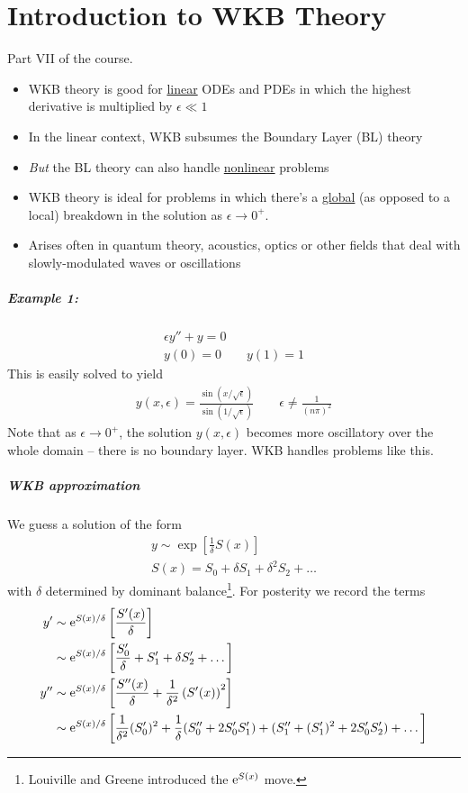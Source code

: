 \chapter[WKB]{Introduction to WKB Theory}
Part VII of the course.
\begin{itemize}
	\item WKB theory is good for \underline{linear} ODEs and PDEs in which the highest derivative is multiplied by $\epsilon \ll 1$
	\item In the linear context, WKB subsumes the Boundary Layer (BL) theory
	\item \emph{But} the BL theory can also handle \underline{nonlinear} problems
	\item WKB theory is ideal for problems in which there's a \underline{global} (as opposed to a local) breakdown in the solution as $\epsilon \rightarrow 0^+$.  
	\item Arises often in quantum theory, acoustics, optics or other fields that deal with slowly-modulated waves or oscillations
\end{itemize}
 
\paragraph{Example 1:}
\begin{gather*}
	\epsilon y'' + y = 0 \\
	y(0) = 0 \qquad y(1) = 1
\end{gather*}
This is easily solved to yield
\begin{gather*}
	y(x,\epsilon) = \frac{\sin (x/\sqrt{\epsilon})}{\sin (1/\sqrt{\epsilon})} \qquad 
	\epsilon \neq \frac{1}{(n\pi)^2}
\end{gather*}
Note that as $\epsilon \rightarrow 0^+$, the solution $y(x,\epsilon)$ becomes more oscillatory over the whole domain -- there is no boundary layer. WKB handles problems like this.

\paragraph{WKB approximation}

We guess a solution of the form
\begin{gather*}
	y \sim \exp \left[\frac{1}{\delta} S(x)\right] \\
	S(x) = S_0 + \delta S_1 + \delta^2 S_2 + \dots 
\end{gather*}
with $\delta$ determined by dominant balance\footnote{Louiville and Greene introduced the $\mathrm{e}^{S(x)}$ move.}. For posterity we record the terms
\begin{align*}
	y' &\sim  \mathrm{e}^{S(x)/\delta }   \left[\frac{S'(x)}{\delta}\right]  \\
	 & \sim  \mathrm{e}^{S(x)/\delta } \left[\frac{S_0'}{\delta} + S_1' + \delta S_2' + \dots \right]  \\
	y'' &\sim  \mathrm{e}^{S(x)/\delta } \left[\frac{S''(x)}{\delta} + \frac{1}{\delta^2}\left(S'(x)\right)^2\right] \\
	& \sim \mathrm{e}^{S(x)/\delta } \left[ \frac{1}{\delta^2} (S_0')^2 + \frac{1}{\delta} (S_0'' + 2 S_0' S_1') + (S_1'' + (S_1')^2 + 2 S_0' S_2') + \dots\right]
\end{align*}



